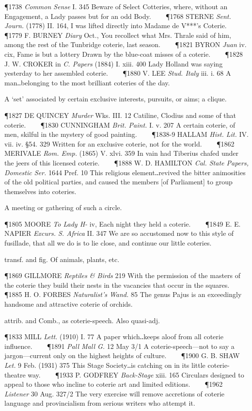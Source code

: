 \begin{description}[wide, labelwidth=!, labelindent=0pt]
\begin{myenumerate}
\P 1738  \textit{Common Sense} I. 345 Beware of Select Cotteries, where, without an Engagement, a Lady passes but for an odd Body.    
\P 1768 STERNE  \textit{Sent. Journ.} (1778) II. 164, I was lifted directly into Madame de V***'s Coterie.    
\P 1779 F. BURNEY  \textit{Diary} Oct., You recollect what Mrs. Thrale said of him, among the rest of the Tunbridge coterie, last season.    
\P 1821 BYRON  \textit{Juan} iv. cix, Fame is but a lottery Drawn by the blue-coat misses of a coterie.    
\P 1828 J. W. CROKER in \textit{C. Papers} (1884) I. xiii. 400 Lady Holland was saying yesterday to her assembled coterie.    
\P 1880 V. LEE  \textit{Stud. Italy} iii. i. 68 A man‥belonging to the most brilliant coteries of the day.

 A ‘set’ associated by certain exclusive interests, pursuits, or aims; a clique.

\P 1827 DE QUINCEY  \textit{Murder} Wks. III. 12 Catiline, Clodius and some of that coterie.    
\P 1830 CUNNINGHAM  \textit{Brit. Paint.} I. v. 207 A certain coterie, of men, skilful in the mystery of good painting.    
\P 1838-9 HALLAM \textit{Hist. Lit.} IV. vii. iv. §54. 329 Written for an exclusive coterie, not for the world.    
\P 1862 MERIVALE  \textit{Rom. Emp.} (1865) V. xlvi. 359 In vain had Tiberius chafed under the jeers of this licensed coterie.    
\P 1888 W. D. HAMILTON  \textit{Cal. State Papers, Domestic Ser.} 1644 Pref.  10 This religious element‥revived the bitter animosities of the old political parties, and caused the members [of Parliament] to group themselves into coteries.

 A meeting or gathering of such a circle.

\P 1805 MOORE  \textit{To Lady H-} iv, Each night they held a coterie.    
\P 1849 E. E. NAPIER  \textit{Excurs. S. Africa} II. 347 We are so accustomed now to this style of fusillade, that all we do is to lie close, and continue our little coteries.

 transf. and fig. Of animals, plants, etc.

\P 1869 GILLMORE  \textit{Reptiles \& Birds} 219 With the permission of the masters of the coterie they build their nests in the vacancies that occur in the squares.    
\P 1885 H. O. FORBES  \textit{Naturalist's Wand.} 85 The genus Pajus is an exceedingly handsome and attractive coterie of orchids.

 attrib. and Comb., as coterie-speech. Also quasi-adj.

\P 1833 MILL  \textit{Lett.} (1910) I. 77 A paper which‥keeps aloof from all coterie influence.    
\P 1891  \textit{Pall Mall G.} 12 May 3/1 A coterie-speech—not to say a jargon—current only on the highest heights of culture.    
\P 1900 G. B. SHAW  \textit{Let.} 9 Feb. (1931) 375 This Stage Society‥is catching on in its little coterie-theatre way.    
\P 1933 P. GODFREY  \textit{Back-Stage} xiii. 165 Circulars designed to appeal to those who incline to coterie art and limited editions.    
\P 1962  \textit{Listener} 30 Aug. 327/2 The very exercise will remove accretions of coterie language and provincialism from serious writers who attempt it.


\end{myenumerate}
\end{description}
